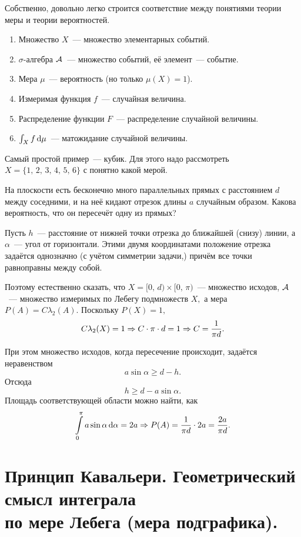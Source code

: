 \documentclass{notes}
\begin{document}
	Собственно, довольно легко строится соответствие между понятиями теории меры и теории вероятностей.
	\begin{enumerate}
		\item Множество $X$~--- множество элементарных событий.
		\item $\sigma$-алгебра $\mathcal{A}$~--- множество событий, её элемент~--- событие.
		\item Мера $\mu$~--- вероятность (но только $\mu(X) = 1$).
		\item Измеримая функция $f$~--- случайная величина.
		\item Распределение функции $F$~--- распределение случайной величины.
		\item $\int_X f \, \mathrm{d} \mu$~--- матожидание случайной величины.
	\end{enumerate}

	\begin{exm}
		Самый простой пример~--- кубик. Для этого надо рассмотреть $X = \{1, \, 2, \, 3, \, 4, \, 5, \, 6\}$ с понятно какой мерой.
	\end{exm}

	\begin{exm}
		На плоскости есть бесконечно много параллельных прямых с расстоянием $d$ между соседними, и на неё кидают отрезок длины $a$ случайным образом. Какова вероятность, что он пересечёт одну из прямых?

		Пусть $h$~--- расстояние от нижней точки отрезка до ближайшей (снизу) линии, а $\alpha$~--- угол от горизонтали. Этими двумя координатами положение отрезка задаётся однозначно (с учётом симметрии задачи,) причём все точки равноправны между собой.

		Поэтому естественно сказать, что $X = [0, \, d) \times [0, \, \pi)$~--- множество исходов, $\mathcal{A}$~--- множество измеримых по Лебегу подмножеств $X,$ а мера $P(A) = C \lambda_2(A)$. Поскольку $P(X) = 1,$
		\[
			C \lambda_2(X) = 1 \Rightarrow C \cdot \pi \cdot d = 1 \Rightarrow C = \dfrac{1}{\pi d}.
		\]

		При этом множество исходов, когда пересечение происходит, задаётся неравенством 
		\[
			a \sin \alpha \geqslant d - h.
		\]
		Отсюда
		\[
			h \geqslant d - a \sin \alpha.
		\]
		Площадь соответствующей области можно найти, как
		\[
			\int\limits_0^{\pi} a \sin \alpha \, \mathrm{d} \alpha = 2 a \Rightarrow P(A) = \dfrac{1}{\pi d} \cdot 2a = \dfrac{2a}{\pi d}.  
		\]
	\end{exm}

\section{Принцип Кавальери. Геометрический смысл интеграла \\ по мере Лебега (мера подграфика).}
\end{document}
